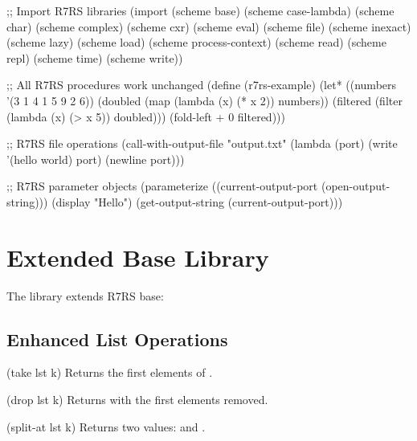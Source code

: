 \begin{example}[R7RS Libraries]
\begin{lambdustcode}
;; Import R7RS libraries
(import (scheme base)
        (scheme case-lambda)
        (scheme char)
        (scheme complex)
        (scheme cxr)
        (scheme eval)
        (scheme file)
        (scheme inexact)
        (scheme lazy)
        (scheme load)
        (scheme process-context)
        (scheme read)
        (scheme repl)
        (scheme time)
        (scheme write))

;; All R7RS procedures work unchanged
(define (r7rs-example)
  (let* ((numbers '(3 1 4 1 5 9 2 6))
         (doubled (map (lambda (x) (* x 2)) numbers))
         (filtered (filter (lambda (x) (> x 5)) doubled)))
    (fold-left + 0 filtered)))

;; R7RS file operations
(call-with-output-file "output.txt"
  (lambda (port)
    (write '(hello world) port)
    (newline port)))

;; R7RS parameter objects
(parameterize ((current-output-port (open-output-string)))
  (display "Hello")
  (get-output-string (current-output-port)))
\end{lambdustcode}
\end{example}

\section{Extended Base Library}
\label{sec:extended-base}


The  library extends R7RS base:

\subsection{Enhanced List Operations}
\label{subsec:enhanced-lists}

\begin{procspec}{(take lst k)}
Returns the first  elements of .
\end{procspec}

\begin{procspec}{(drop lst k)}
Returns  with the first  elements removed.
\end{procspec}

\begin{procspec}{(split-at lst k)}
Returns two values:  and .
\end{procspec}

